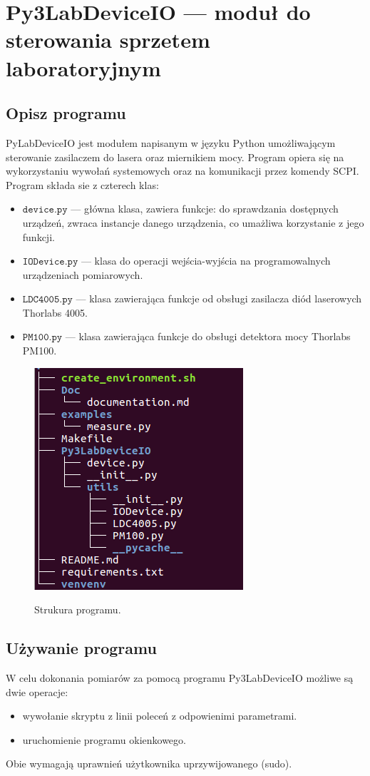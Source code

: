 \documentclass[a4paper, portrait,12pt]{mwrep}
\begin{document}
\chapter{Py3LabDeviceIO --- moduł do sterowania sprzetem laboratoryjnym}
\section{Opisz programu}
PyLabDeviceIO jest modułem napisanym w języku Python umożliwającym sterowanie zasilaczem do lasera oraz miernikiem mocy. Program opiera się na wykorzystaniu wywołań systemowych oraz na komunikacji przez komendy SCPI. \\

Program składa sie z czterech klas:
\begin{itemize}
\item $\mathtt{device.py}$ --- główna klasa, zawiera funkcje: do sprawdzania dostępnych urządzeń, 
zwraca instancje danego urządzenia, co umażliwa korzystanie z jego funkcji. 
\item $\mathtt{IODevice.py}$ --- klasa do operacji wejścia-wyjścia na programowalnych urządzeniach pomiarowych.
\item $\mathtt{LDC4005.py}$ --- klasa zawierająca funkcje od obsługi zasilacza diód laserowych Thorlabs 4005.
\item $\mathtt{PM100.py}$ --- klasa zawierająca funkcje do obsługi detektora mocy Thorlabs PM100.
\end{itemize}
\begin{figure}[h]
\center
  \includegraphics[scale=0.45]{tree.png}
  \label{rys1}
  \caption{Strukura programu.} 
\end{figure}
\section{Używanie programu}
W celu dokonania pomiarów za pomocą programu Py3LabDeviceIO możliwe są dwie operacje:
\begin{itemize}
\item wywołanie skryptu z linii poleceń z odpowienimi parametrami.
\item uruchomienie programu okienkowego.
\end{itemize}
Obie wymagają uprawnień użytkownika uprzywijowanego (sudo).
\newpage
\end{document}
